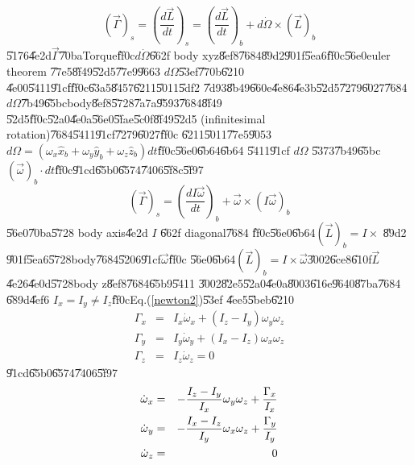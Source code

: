 \documentclass[12pt,a4paper]{article}
\begin{document}
\begin{equation}
\left( \vec{\Gamma}\right) _{s}=\left( \frac{d\vec{L}}{dt}\right)
_{s}=\left( \frac{d\vec{L}}{dt}\right) _{b}+d\dot{\Omega}\times \left( \vec{L%
}\right) _{b}  \label{newton1}
\end{equation}%
\U{5176}\U{4e2d}$\vec{\Gamma}$\U{70ba}Torque\U{ff0c}$d\dot{\Omega}$\U{662f}%
body xyz\U{8ef8}\U{7684}\U{89d2}\U{901f}\U{5ea6}\U{ff0c}\U{56e0}euler theorem%
\U{77e5}\U{8f49}\U{52d5}\U{77e9}\U{9663} $d\Omega $\U{53ef}\U{770b}\U{6210}%
\U{4e00}\U{5411}\U{91cf}\U{ff0c}\U{63a5}\U{8457}\U{6211}\U{5011}\U{5df2}%
\U{7d93}\U{8b49}\U{660e}\U{4e86}\U{4e3b}\U{52d5}\U{7279}\U{6027}\U{7684}$%
d\Omega $\U{7b49}\U{65bc}body\U{8ef8}\U{5728}\U{7a7a}\U{9593}\U{7684}\U{8f49}%
\U{52d5}\U{ff0c}\U{52a0}\U{4e0a}\U{56e0}\U{5fae}\U{5c0f}\U{8f49}\U{52d5}%
(infinitesimal rotation)\U{7684}\U{5411}\U{91cf}\U{7279}\U{6027}\U{ff0c}%
\U{6211}\U{5011}\U{77e5}\U{9053}$d\Omega =(\omega _{x}\hat{x}_{b}+\omega _{y}%
\hat{y}_{b}+\omega _{z}\hat{z}_{b})dt$\U{ff0c}\U{56e0}\U{6b64}\U{6b64}%
\U{5411}\U{91cf} $d\Omega $ \U{5373}\U{7b49}\U{65bc} $\left( \vec{\omega}%
\right) _{b}\cdot dt$\U{ff0c}\U{91cd}\U{65b0}\U{6574}\U{7406}\U{5f8c}\U{5f97}%
\begin{equation}
\left( \vec{\Gamma}\right) _{s}=\left( \frac{dI\vec{\omega}}{dt}\right) _{b}+%
\vec{\omega}\times \left( I\vec{\omega}\right) _{b}  \label{newton2}
\end{equation}%
\U{56e0}\U{70ba}\U{5728} body axis\U{4e2d} $I$ \U{662f} diagonal\U{7684}%
\U{ff0c}\U{56e0}\U{6b64}$\left( \vec{L}\right) _{b}=I\times $ \U{89d2}%
\U{901f}\U{5ea6}\U{5728}body\U{7684}\U{5206}\U{91cf}$\vec{\omega}$\U{ff0c}%
\U{56e0}\U{6b64}$(\vec{L})_{b}=I\times \vec{\omega}$\U{3002}\U{6ce8}\U{610f}$%
\vec{L}$\U{4e26}\U{4e0d}\U{5728}body z\U{8ef8}\U{7684}\U{65b9}\U{5411}%
\U{3002}\U{82e5}\U{52a0}\U{4e0a}\U{8003}\U{616e}\U{9640}\U{87ba}\U{7684}%
\U{689d}\U{4ef6} $I_{x}=I_{y}\neq I_{z}$\U{ff0c}Eq.(\ref{newton2})\U{53ef}%
\U{4ee5}\U{5beb}\U{6210}%
\begin{eqnarray}
\Gamma _{x} &=&I_{x}\dot{\omega}_{x}+(I_{z}-I_{y})\omega _{y}\omega _{z} \\
\Gamma _{y} &=&I_{y}\dot{\omega}_{y}+(I_{x}-I_{z})\omega _{x}\omega _{z} \\
\Gamma _{z} &=&I_{z}\dot{\omega}_{z}=0
\end{eqnarray}%
\U{91cd}\U{65b0}\U{6574}\U{7406}\U{5f97}%
\begin{eqnarray}
\dot{\omega}_{x} &=&-\frac{I_{z}-I_{y}}{I_{x}}\omega _{y}\omega _{z}+\frac{%
\Gamma _{x}}{I_{x}} \\
\dot{\omega}_{y} &=&-\frac{I_{x}-I_{z}}{I_{y}}\omega _{x}\omega _{z}+\frac{%
\Gamma _{y}}{I_{y}} \\
\dot{\omega}_{z} &=&0
\end{eqnarray}%
\end{document}
